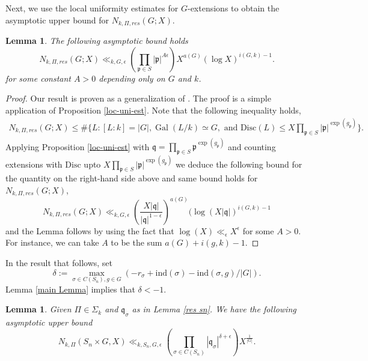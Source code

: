 \documentclass[11pt]{amsart}
\newtheorem{Lemma}[theorem]{Lemma}
\newcommand{\fq}{\mathfrak{q}}
\newcommand{\fp}{\mathfrak{p}}
\newcommand{\disc}{\mathrm{Disc}}
\newcommand{\ind}{\mathrm{ind}}
\newcommand{\op}[1]{\operatorname{#1}}
\numberwithin{equation}{section}
\begin{document}
Next, we use the local uniformity estimates for $G$-extensions to obtain the asymptotic upper bound for $N_{k,\Pi, res}(G; X)$.
\begin{Lemma}\label{res G}
    The following asymptotic bound holds
    \[
    N_{k,\Pi,res}(G; X) \ll_{k, G, \epsilon} \left(\prod_{\fp \in S}|\fp|^{A\epsilon}\right)X^{a(G)}(\log X)^{i(G,k)-1}.
    \]
    for some constant $A > 0$ depending only on $G$ and $k$. 
\end{Lemma}
\begin{proof}
    Our result is proven as a generalization of \cite[equation (5.14)]{Wang2020}. The proof is a simple application of Proposition \ref{loc-uni-est}. Note that the following inequality holds,
    \begin{align*}
       N_{k,\Pi,res}(G; X) \leq \#\{L: [L:k]=|G|, \op{Gal}(L/k)\simeq G, \text{ and }\disc(L) \leq X\prod_{\fp \in S}|\fp|^{\exp(g_{\fp})}\}.
    \end{align*}
    Applying Proposition \ref{loc-uni-est} with $\fq = \prod_{\fp \in S}\fp^{\exp(g_{\fp})}$ and counting extensions with $\disc$ upto $X\prod_{\fp \in S}|\fp|^{\exp(g_{\fp})}$ we deduce the following bound for the quantity on the right-hand side above and same bound holds for $N_{k,\Pi, res}(G; X)$,
    \[
     N_{k,\Pi,res}(G; X) \ll_{k,G,\epsilon} \left(\frac{X|\fq|}{|\fq|^{1-\epsilon}}\right)^{a(G)}(\log (X|\fq|)^{i(G,k)-1}
    \]
    and the Lemma follows by using the fact that $\log(X) \ll_{\epsilon} X^{\epsilon}$ for some $A>0$. For instance, we can take $A$ to be the sum $a(G)+i(g,k)-1$.
\end{proof}
 In the result that follows, set \[\delta := \max_{\sigma \in C(S_n), g \in G}(-r_\sigma+\ind(\sigma)-\ind(\sigma,g)/|G|).\] Lemma \ref{main Lemma} implies that $\delta<-1$.
\begin{Lemma}\label{prod res bound}
    Given $\Pi \in \Sigma_k$ and $\fq_\sigma$ as in Lemma \ref{res sn}. We have the following asymptotic upper bound 
    \[
    N_{k,\Pi}(S_n\times G, X) \ll_{k,S_n,G, \epsilon} \left(\prod_{\sigma \in C(S_n)}|\fq_\sigma|^{\delta+\epsilon}\right)X^{\frac{1}{|G|}}.
    \]
   
\end{Lemma}
\end{document}
